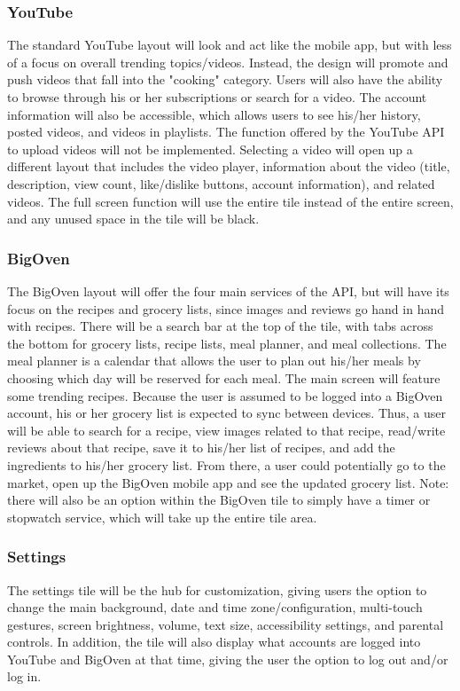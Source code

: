 \documentclass[fleqn,10pt]{wlpeerj}
\begin{document}
\subsubsection*{YouTube}
The standard YouTube layout will look and act like the mobile app, but with less of a focus on overall trending topics/videos. Instead, the design will promote and push videos that fall into the "cooking" category. Users will also have the ability to browse through his or her subscriptions or search for a video. The account information will also be accessible, which allows users to see his/her history, posted videos, and videos in playlists. The function offered by the YouTube API to upload videos will not be implemented. Selecting a video will open up a different layout that includes the video player, information about the video (title, description, view count, like/dislike buttons, account information), and related videos. The full screen function will use the entire tile instead of the entire screen, and any unused space in the tile will be black.

\subsubsection*{BigOven}
The BigOven layout will offer the four main services of the API, but will have its focus on the recipes and grocery lists, since images and reviews go hand in hand with recipes. There will be a search bar at the top of the tile, with tabs across the bottom for grocery lists, recipe lists, meal planner, and meal collections. The meal planner is a calendar that allows the user to plan out his/her meals by choosing which day will be reserved for each meal. The main screen will feature some trending recipes. Because the user is assumed to be logged into a BigOven account, his or her grocery list is expected to sync between devices. Thus, a user will be able to search for a recipe, view images related to that recipe, read/write reviews about that recipe, save it to his/her list of recipes, and add the ingredients to his/her grocery list. From there, a user could potentially go to the market, open up the BigOven mobile app and see the updated grocery list. Note: there will also be an option within the BigOven tile to simply have a timer or stopwatch service, which will take up the entire tile area. 

\subsubsection*{Settings}
The settings tile will be the hub for customization, giving users the option to change the main background, date and time zone/configuration, multi-touch gestures, screen brightness, volume, text size, accessibility settings, and parental controls. In addition, the tile will also display what accounts are logged into YouTube and BigOven at that time, giving the user the option to log out and/or log in.
\end{document}
